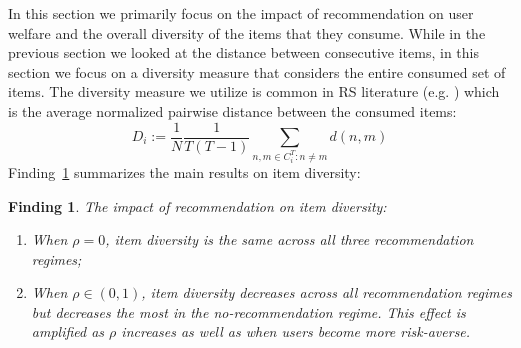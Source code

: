 \documentclass[manuscript, nonacm]{acmart}
\newtheorem{finding}{Finding}
\begin{document}
In this section we primarily focus on the impact of recommendation on user welfare and the overall diversity of the items that they consume. While in the previous section we looked at the distance between consecutive items, in this section we focus on a diversity measure that considers the entire consumed set of items. The diversity measure we utilize is common in RS literature (e.g. \cite{ziegler2005improving}) which is the average normalized pairwise distance between the consumed items:
$$D_i:=\frac{1}{N}\frac{1}{T(T-1)}\sum_{n,m \in C_i^T: n \ne m} d(n,m)$$
\noindent 
Finding~\ref{finding_diversity} summarizes the main results on item diversity:
\begin{finding}\label{finding_diversity}
The impact of recommendation on item diversity:
\begin{enumerate}
\item When $\rho = 0$, item diversity is the same across all three recommendation regimes;
\item When $\rho \in (0,1)$, item diversity decreases across all recommendation regimes but decreases the most in the no-recommendation regime. This effect is amplified as $\rho$ increases as well as when users become more risk-averse.
\end{enumerate}
\end{finding}
\par 
\end{document}
